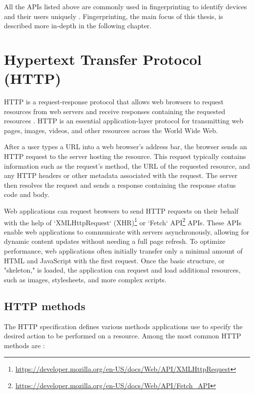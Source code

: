 All the APIs listed above are commonly used in fingerprinting to identify devices and their users uniquely \cite{FingerprintingSurvey}. Fingerprinting, the main focus of this thesis, is described more in-depth in the following chapter.

\section{Hypertext Transfer Protocol (HTTP)}
\label{Section:HTTP}

HTTP is a request-response protocol that allows web browsers to request resources from web servers and receive responses containing the requested resources \cite{MasteringNodeJS}. HTTP is an essential application-layer protocol for transmitting web pages, images, videos, and other resources across the World Wide Web.

After a user types a URL into a web browser's address bar, the browser sends an HTTP request to the server hosting the resource. This request typically contains information such as the request's method, the URL of the requested resource, and any HTTP headers or other metadata associated with the request. The server then resolves the request and sends a response containing the response status code and body.

Web applications can request browsers to send HTTP requests on their behalf with the help of `XMLHttpRequest` (XHR)\footnote{\url{https://developer.mozilla.org/en-US/docs/Web/API/XMLHttpRequest}} or `Fetch` API\footnote{\url{https://developer.mozilla.org/en-US/docs/Web/API/Fetch_API}} APIs. These APIs enable web applications to communicate with servers asynchronously, allowing for dynamic content updates without needing a full page refresh. To optimize performance, web applications often initially transfer only a minimal amount of HTML and JavaScript with the first request. Once the basic structure, or "skeleton," is loaded, the application can request and load additional resources, such as images, stylesheets, and more complex scripts.

\subsection{HTTP methods}

The HTTP specification \cite{RFC9110} defines various methods applications use to specify the desired action to be performed on a resource. Among the most common HTTP methods are \cite{MDN}:


